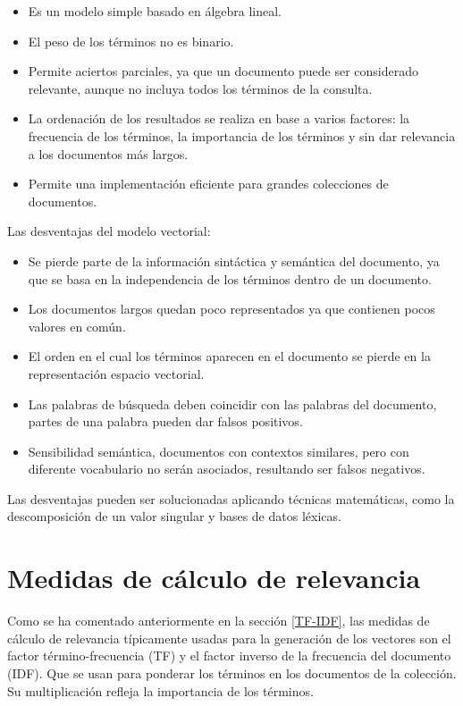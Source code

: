 \documentclass[titlepage]{article}
\begin{document}
	\begin{itemize}
		\item Es un modelo simple basado en álgebra lineal. 
		\item El peso de los términos no es binario. 
		\item Permite aciertos parciales, ya que un documento puede ser considerado relevante, aunque no incluya todos los términos de la consulta. 
		\item La ordenación de los resultados se realiza en base a varios factores: la frecuencia de los términos, la importancia de los términos y sin dar relevancia a los documentos más largos. 
		\item Permite una implementación eficiente para grandes colecciones de documentos.
	\end{itemize}
	
	Las desventajas del modelo vectorial:
	
	\begin{itemize}
		\item Se pierde parte de la información sintáctica y semántica del documento, ya que se basa en la independencia de los términos dentro de un documento. 
		\item Los documentos largos quedan poco representados ya que contienen pocos valores en común. 
		\item El orden en el cual los términos aparecen en el documento se pierde en la representación espacio vectorial. 
		\item Las palabras de búsqueda deben coincidir con las palabras del documento, partes de una palabra pueden dar falsos positivos. 
		\item Sensibilidad semántica, documentos con contextos similares, pero con diferente vocabulario no serán asociados, resultando ser falsos negativos. 
	\end{itemize}
	
	Las desventajas pueden ser solucionadas aplicando técnicas matemáticas, como la descomposición de un valor singular y bases de datos léxicas.
	
	\section{Medidas de cálculo de relevancia}	\label{sec:Medidas de cálculo de relevancia}
	
	Como se ha comentado anteriormente en la sección \ref{TF-IDF}, las medidas de cálculo de relevancia típicamente usadas para la generación de los vectores son el factor término-frecuencia (TF) y el factor inverso de la frecuencia del documento (IDF). Que se usan para ponderar los términos en los documentos de la colección. Su multiplicación refleja la importancia de los términos.
	
\end{document}
